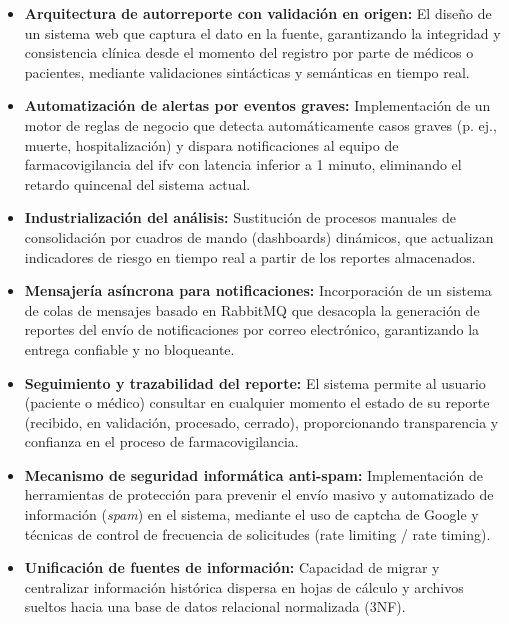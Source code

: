 \begin{itemize}
    \item \textbf{Arquitectura de \gls{autorreporte} con validación en origen:} El diseño de un sistema web que captura el dato en la fuente, garantizando la integridad y consistencia clínica desde el momento del registro por parte de médicos o pacientes, mediante validaciones sintácticas y semánticas en tiempo real.
    
    \item \textbf{Automatización de alertas por eventos graves:} Implementación de un motor de reglas de negocio que detecta automáticamente casos graves (p. ej., muerte, hospitalización) y dispara notificaciones al equipo de farmacovigilancia del \gls{ifv} con latencia inferior a 1 minuto, eliminando el retardo quincenal del sistema actual.
    
    \item \textbf{Industrialización del análisis:} Sustitución de procesos manuales de consolidación por cuadros de mando (dashboards) dinámicos, que actualizan indicadores de riesgo en tiempo real a partir de los reportes almacenados.
    
    \item \textbf{Mensajería asíncrona para notificaciones:} Incorporación de un sistema de colas de mensajes basado en RabbitMQ que desacopla la generación de reportes del envío de notificaciones por correo electrónico, garantizando la entrega confiable y no bloqueante. 
    
   \item \textbf{Seguimiento y trazabilidad del reporte:} El sistema permite al usuario (paciente o médico) consultar en cualquier momento el estado de su reporte (recibido, en validación, procesado, cerrado), proporcionando transparencia y confianza en el proceso de farmacovigilancia.
    
   \item \textbf{Mecanismo de seguridad informática anti-spam:} Implementación de herramientas de protección para prevenir el envío masivo y automatizado de información (\textit{\gls{spam}}) en el sistema, mediante el uso de \gls{captcha} de Google y técnicas de control de frecuencia de solicitudes (\gls{rate limiting} / \gls{rate timing}).
    
   \item \textbf{Unificación de fuentes de información:} Capacidad de migrar y centralizar información histórica dispersa en hojas de cálculo y archivos sueltos hacia una base de datos relacional normalizada (3NF).

\end{itemize}

